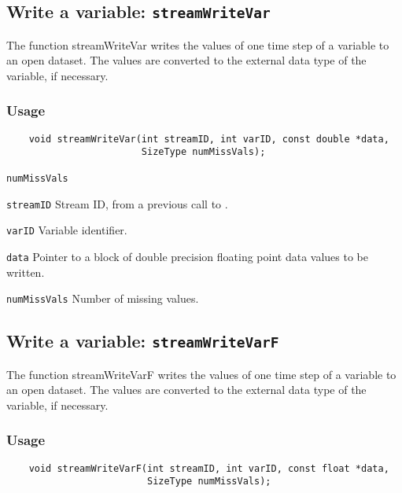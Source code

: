 

\subsection{Write a variable: \texttt{streamWriteVar}}
\label{streamWriteVar}

The function streamWriteVar writes the values of one time step of a variable to an open dataset.
The values are converted to the external data type of the variable, if necessary.
\subsubsection*{Usage}

\begin{verbatim}
    void streamWriteVar(int streamID, int varID, const double *data, 
                        SizeType numMissVals);
\end{verbatim}

\hspace*{4mm}\begin{minipage}[]{15cm}
\begin{deflist}{\texttt{numMissVals}\ }
\item[\texttt{streamID}]
Stream ID, from a previous call to {}.
\item[\texttt{varID}]
Variable identifier.
\item[\texttt{data}]
Pointer to a block of double precision floating point data values to be written.
\item[\texttt{numMissVals}]
Number of missing values.

\end{deflist}
\end{minipage}


\subsection{Write a variable: \texttt{streamWriteVarF}}
\label{streamWriteVarF}

The function streamWriteVarF writes the values of one time step of a variable to an open dataset.
The values are converted to the external data type of the variable, if necessary.
\subsubsection*{Usage}

\begin{verbatim}
    void streamWriteVarF(int streamID, int varID, const float *data, 
                         SizeType numMissVals);
\end{verbatim}

